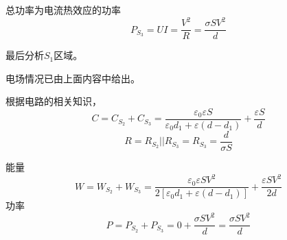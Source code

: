 \documentclass[a4paper]{article}
\begin{document}
		总功率为电流热效应的功率
		\begin{equation}
			P_{S_3} = UI = \frac{V^2}{R} = \frac{\sigma S V^2}{d}
		\end{equation}\par
		最后分析$S_1$区域。\par
		电场情况已由上面内容中给出。\par
		根据电路的相关知识，
		\begin{equation}
			C = C_{S_2} + C_{S_3} = \frac{\varepsilon_0 \varepsilon S}{\varepsilon_0 d_1 + \varepsilon (d-d_1)} + \frac{\varepsilon S}{d}
		\end{equation}
		\begin{equation}
			R = R_{S_2} || R_{S_3} = R_{S_3} = \frac{d}{\sigma S}
		\end{equation}\par
		能量
		\begin{equation}
			W = W_{S_2} + W_{S_3} = \frac{\varepsilon_0 \varepsilon S V^2}{2[\varepsilon_0 d_1 + \varepsilon (d-d_1)]} + \frac{\varepsilon S V^2}{2d}
		\end{equation}
		功率
		\begin{equation}
			P = P_{S_2} + P_{S_3} = 0 + \frac{\sigma S V^2}{d} = \frac{\sigma S V^2}{d}
		\end{equation}
\end{document}

